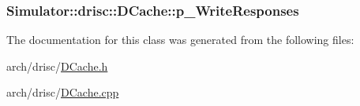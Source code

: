 \hypertarget{class_simulator_1_1drisc_1_1_d_cache_aaf3fd21ca8cd24b70348ccd7452c7ce7}{
\subsubsection[{p\+\_\+\+Write\+Responses}]{ Simulator\+::drisc\+::\+D\+Cache\+::p\+\_\+\+Write\+Responses}}\label{class_simulator_1_1drisc_1_1_d_cache_aaf3fd21ca8cd24b70348ccd7452c7ce7}


The documentation for this class was generated from the following files\+:\begin{DoxyCompactItemize}
\item 
arch/drisc/\hyperlink{_d_cache_8h}{D\+Cache.\+h}\item 
arch/drisc/\hyperlink{_d_cache_8cpp}{D\+Cache.\+cpp}\end{DoxyCompactItemize}
